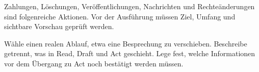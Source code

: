 \begin{achtung}
Zahlungen, Löschungen, Veröffentlichungen, Nachrichten und Rechteänderungen sind folgenreiche Aktionen. Vor der Ausführung müssen Ziel, Umfang und sichtbare Vorschau geprüft werden.
\end{achtung}

\begin{praxis}
Wähle einen realen Ablauf, etwa eine Besprechung zu verschieben. Beschreibe getrennt, was in Read, Draft und Act geschieht. Lege fest, welche Informationen vor dem Übergang zu Act noch bestätigt werden müssen.
\end{praxis}
